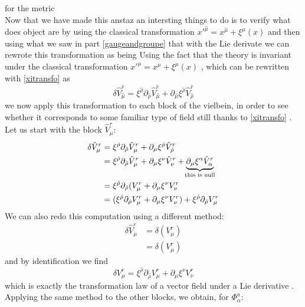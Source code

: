 \documentclass{article}
\begin{document}
for the metric\\
Now that we have made this anstaz an intersting things to do is to verify what does object are by using the classical transformation $x'^{ \hat \mu} = x^{ \hat \mu} +\xi^{\mu}(x)$ and then using what we saw in  part \ref{gaugeandgroupe} that with the Lie derivate we can rewrote this transformation as being
Using the fact that the theory is invariant under the classical transformation $x'^\mu = x^\mu + \xi^\mu(x)$ \cite{scherk1979get}, which can be rewritten with \eqref{xitransfo} as 
 \begin{equation}
    \delta  \hat V^{\hat r}_{\hat \mu } = \xi^{\hat \rho}  \partial_{\hat \rho} \hat V^{\hat r}_{\hat \mu} + \partial_{\hat \mu} \xi^{\hat \rho} \hat V^{ \hat r}_{\hat \rho} 
 \end{equation}
 we now apply this transformation to each block of the vielbein, in order to see whether it corresponds to some familiar type of field still thanks to \eqref{xitransfo} . Let us start with the block $\hat V^r_\mu$:
\begin{align*}
    \delta \hat V^r_\mu &=  \xi^{\hat \rho}  \partial_{\hat \rho} \hat V^{ r}_{ \mu} + \partial_{ \mu} \xi^{ \hat \rho} \hat V^{  r}_{\hat \rho} \\
   &=  \xi^{\hat \rho}  \partial_{\hat \rho} \hat V^{ r}_{ \mu} + \partial_{ \mu} \xi^{ \nu} \hat V^{  r}_{\nu} + \underbrace{\partial_{ \mu } \xi^{  \alpha } \hat V^{  r}_{ \alpha }}_{\mathclap{\text{this is null}}}\\
   &=  \xi^{\hat \rho}  \partial_{\hat \rho}( V^{ r}_{ \mu} +  \partial_{ \mu} \xi^{ \nu} V^{  r}_{\nu} \\
   &= (\xi^{\hat \rho}  \partial_{\hat \rho}V^{ r}_{ \mu} +  \partial_{ \mu} \xi^{ \nu} V^{  r}_{\nu} ) + \xi^{\hat \rho}  \partial_{\hat \rho} V^{ r}_{ \mu}
\end{align*}
We can also redo this computation using a different method:
\begin{align*}
    \delta \hat V^r_\mu &= \delta(  V^r_\mu)\\
    & =    \delta (V^r_\mu)
\end{align*}
and by identification we find
\begin{equation*}
    \delta V^r_\mu =  \xi^{\hat \rho}  \partial_{\hat \rho}V^{ r}_{ \mu} +  \partial_{ \mu} \xi^{ \nu} V^{  r}_{\nu} 
\end{equation*}
which is exactly the transformation law of a vector field under a Lie derivative \cite{freedman2012supergravity}. Applying the same method to the other blocks, we obtain, for $\Phi^a_\alpha$:
\end{document}
